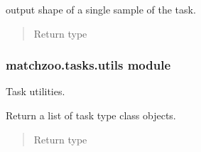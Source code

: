 \documentclass[letterpaper,10pt,english]{sphinxmanual}
\begin{document}
\begin{fulllineitems}

\begin{fulllineitems}
\label{\detokenize{matchzoo.tasks:matchzoo.tasks.ranking.Ranking.output_shape}}
 \textendash{} output shape of a single sample of the task.
\begin{quote}\begin{description}
\item[{Return type}] \leavevmode
{}

\end{description}\end{quote}

\end{fulllineitems}


\end{fulllineitems}



\subsubsection{matchzoo.tasks.utils module}
\label{\detokenize{matchzoo.tasks:module-matchzoo.tasks.utils}}\label{\detokenize{matchzoo.tasks:matchzoo-tasks-utils-module}}
Task utilities.

\begin{fulllineitems}
\label{\detokenize{matchzoo.tasks:matchzoo.tasks.utils.list_available_task_types}}
Return a list of task type class objects.
\begin{quote}\begin{description}
\item[{Return type}] \leavevmode
\sphinxcode{\sphinxupquote{List}}{[}\sphinxcode{\sphinxupquote{Type}}{[}{\hyperref[\detokenize{matchzoo.engine:matchzoo.engine.base_task.BaseTask}]{\sphinxcrossref{\sphinxcode{\sphinxupquote{BaseTask}}}}}{]}{]}

\end{description}\end{quote}

\end{fulllineitems}
\end{document}

